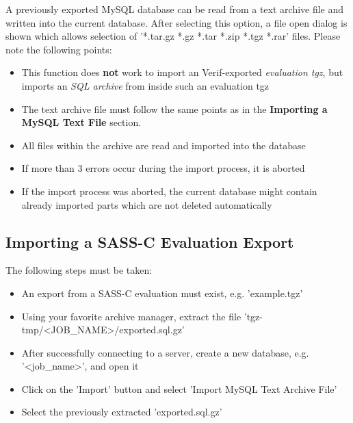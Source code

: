 A previously exported MySQL database can be read from a text archive file and written into the current database. After selecting this option, a file open dialog is shown which allows selection of '*.tar.gz *.gz *.tar *.zip *.tgz *.rar' files. Please note the following points:

\begin{itemize}  
\item This function does \textbf{not} work to import an Verif-exported \textit{evaluation tgz}, but imports an \textit{SQL archive} from inside such an evaluation tgz
\item The text archive file must follow the same points as in the \textbf{Importing a MySQL Text File} section.
\item All files within the archive are read and imported into the database
\item If more than 3 errors occur during the import process, it is aborted
\item If the import process was aborted, the current database might contain already imported parts which are not deleted automatically
\end{itemize}

\subsection{Importing a SASS-C Evaluation Export}

The following steps must be taken:

\begin{itemize}  
\item An export from a SASS-C evaluation must exist, e.g. 'example.tgz'
\item Using your favorite archive manager, extract the file 'tgz-tmp/<JOB\_NAME>/exported.sql.gz'
\item After successfully connecting to a server, create a new database, e.g. '<job\_name>', and open it
\item Click on the 'Import' button and select 'Import MySQL Text Archive File'
\item Select the previously extracted 'exported.sql.gz'
\end{itemize} 
